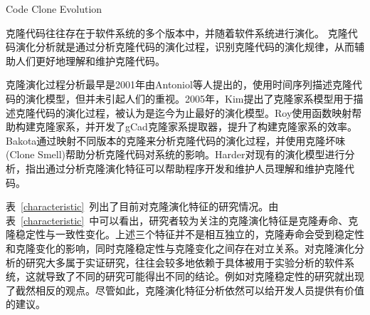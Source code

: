 {Code Clone Evolution}
\label{ref-evolution}

克隆代码往往存在于软件系统的多个版本中，并随着软件系统进行演化。
克隆代码演化分析就是通过分析克隆代码的演化过程，识别克隆代码的演化规律，从而辅助人们更好地理解和维护克隆代码。

克隆演化过程分析最早是2001年由Antoniol等人提出的，使用时间序列描述克隆代码的演化模型\cite{antoniol2001modeling}，但并未引起人们的重视。2005年，Kim提出了克隆家系模型用于描述克隆代码的演化过程，被认为是迄今为止最好的演化模型\cite{kim2005empirical}。Roy使用函数映射帮助构建克隆家系，并开发了gCad克隆家系提取器，提升了构建克隆家系的效率\cite{saha2011automatic}。Bakota通过映射不同版本的克隆来分析克隆代码的演化过程，并使用克隆坏味(Clone Smell)帮助分析克隆代码对系统的影响\cite{bakota2011tracking}。Harder对现有的演化模型进行分析\cite{harder2009modeling}，指出通过分析克隆演化特征可以帮助程序开发和维护人员理解和维护克隆代码。

表~\ref{characteristic}~列出了目前对克隆演化特征的研究情况。由表~\ref{characteristic}~中可以看出，研究者较为关注的克隆演化特征是克隆寿命、克隆稳定性与一致性变化。上述三个特征并不是相互独立的，克隆寿命会受到稳定性和克隆变化的影响，同时克隆稳定性与克隆变化之间存在对立关系。对克隆演化分析的研究大多属于实证研究，往往会较多地依赖于具体被用于实验分析的软件系统，这就导致了不同的研究可能得出不同的结论。例如对克隆稳定性的研究就出现了截然相反的观点。尽管如此，克隆演化特征分析依然可以给开发人员提供有价值的建议。

